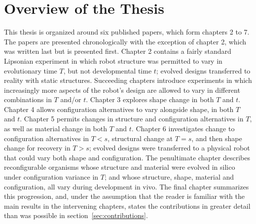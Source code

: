 \section{Overview of the Thesis}
This thesis is organized around six published papers, which form chapters 2 to 7.
The papers are presented chronologically with the exception of chapter 2, which was written last but is presented first.
Chapter 2 contains a fairly standard Lipsonian experiment in which robot structure was permitted to vary in evolutionary time $T$, but not developmental time $t$; evolved designs transferred to reality with static structures.
Succeeding chapters introduce experiments in which increasingly more aspects of the robot's design are allowed to vary in different combinations in $T$ and/or $t$.
Chapter 3 explores shape change in both $T$ and $t$.
Chapter 4 allows configuration alternatives to vary alongside shape, in both $T$ and $t$.
Chapter 5 permits changes in structure and configuration alternatives in $T$, as well as material change in both $T$ and $t$.
Chapter 6 investigates change to configuration alternatives in $T<s$, structural change at $T=s$, and then shape change for recovery in $T>s$; evolved designs were transferred to a physical robot that could vary both shape and configuration.
The penultimate chapter describes reconfigurable organisms whose structure and material were evolved in silico under configuration variance in $T$; and whose structure, shape, material and configuration, all vary during development in vivo.
The final chapter summarizes this progression,
and, under the assumption that the reader is familiar with the main results in the intervening chapters, states the contributions in greater detail than was possible in section~\ref{sec:contributions}.


